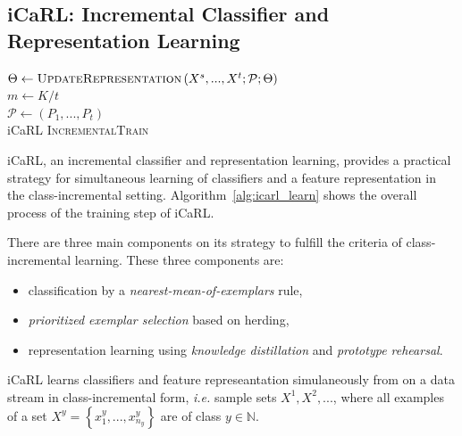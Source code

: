 \subsection{iCaRL: Incremental Classifier and Representation Learning}
\label{sec:icarl}

\begin{algorithm}[ht]
  $\Theta \leftarrow \textsc{UpdateRepresentation}\left(X^s, ..., X^t;\mathcal{P};\Theta\right)$ \\
  $m \leftarrow K/t$  \\
  $\mathcal{P} \leftarrow \left(P_1, ..., P_t\right)$  \\
\caption{ iCaRL \textsc{IncrementalTrain} \label{alg:icarl_learn}}
\end{algorithm}


iCaRL, an incremental classifier and representation learning, provides a practical strategy for simultaneous learning of classifiers and a feature representation in the class-incremental setting. Algorithm~\ref{alg:icarl_learn} shows the overall process of the training step of iCaRL.

There are three main components on its strategy to fulfill the criteria of class-incremental learning. These three components are:

\begin{itemize}
  \item classification by a \textit{nearest-mean-of-exemplars} rule,
  \item \textit{prioritized exemplar selection} based on herding,
  \item representation learning using \textit{knowledge distillation} and \textit{prototype rehearsal}.
\end{itemize}

iCaRL learns classifiers and feature represeantation simulaneously from on a data stream in class-incremental form, \textit{i.e.} sample sets $X^1, X^2, ...$, where all examples of a set $X^y = \left\{ x_1^y, ..., x_{n_y}^y \right\}$ are of class $y \in \mathbb{N}$.

